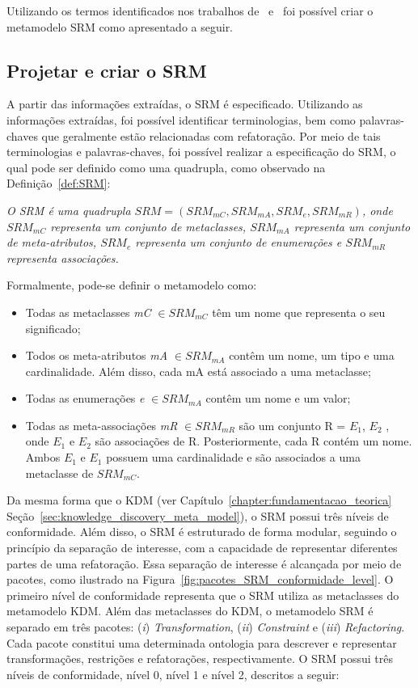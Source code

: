 Utilizando os termos identificados nos trabalhos de~ e~ foi possível criar o metamodelo SRM como apresentado a seguir. 

\subsection{Projetar e criar o SRM}

A partir das informações extraídas, o SRM é especificado. Utilizando as informações extraídas, foi possível identificar terminologias, bem como palavras-chaves que geralmente estão relacionadas com refatoração. Por meio de tais terminologias e palavras-chaves, foi possível realizar a especificação do SRM, o qual pode ser definido como uma quadrupla, como observado na Definição~\ref{def:SRM}: 

\begin{definicao}\label{def:SRM}
    \textit{O SRM é uma quadrupla $SRM = (SRM_{mC}, SRM_{mA}, SRM_{e}, SRM_{mR})$, onde $SRM_{mC} $ representa um conjunto de metaclasses, $SRM_{mA}$ representa um conjunto de meta-atributos, $SRM_{e}$ representa um conjunto de enumerações e $SRM_{mR}$ representa associações.}
\end{definicao}

Formalmente, pode-se definir o metamodelo como:

\begin{itemize}
	\item Todas as metaclasses \textit{mC} $\in SRM_{mC}$ têm um nome que representa o seu significado;
	\item Todos os meta-atributos \textit{mA} $\in SRM_{mA}$ contêm um nome, um tipo e uma cardinalidade. Além disso, cada mA está associado a uma metaclasse;
	\item Todas as enumerações \textit{e} $\in SRM_{mA}$ contêm um nome e um valor;
	\item Todas as meta-associações \textit{mR} $\in SRM_{mR}$ são um conjunto R = $E_{1}$, $E_{2}$  , onde  $E_{1}$ e $E_{2}$ são associações de R. Posteriormente, cada R contém um nome. Ambos $E_{1}$  e $E_{1}$ possuem uma cardinalidade e são associados a uma metaclasse de $SRM_{mC}$.
\end{itemize}

Da mesma forma que o KDM (ver Capítulo~\ref{chapter:fundamentacao_teorica} Seção~\ref{sec:knowledge_discovery_meta_model}), o SRM possui três níveis de conformidade. Além disso, o SRM é estruturado de forma modular, seguindo o princípio da separação de interesse, com a capacidade de representar diferentes partes de uma refatoração. Essa separação de interesse é alcançada por meio de pacotes, como ilustrado na Figura~\ref{fig:pacotes_SRM_conformidade_level}. O primeiro nível de conformidade representa que o SRM utiliza as metaclasses do metamodelo KDM. Além das metaclasses do KDM, o metamodelo SRM é separado em três pacotes: (\textit{i}) \textit{Transformation}, (\textit{ii}) \textit{Constraint} e (\textit{iii}) \textit{Refactoring}. Cada pacote constitui uma determinada ontologia para descrever e representar transformações, restrições e refatorações, respectivamente. O SRM possui três níveis de conformidade, nível 0, nível 1 e nível 2, descritos a seguir:

